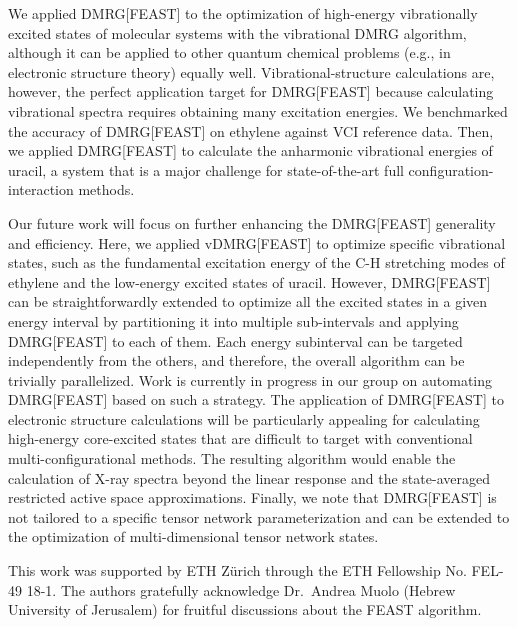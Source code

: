 \documentclass[journal=jctcce]{achemso}
\begin{document}
\noindent We applied DMRG[FEAST] to the optimization of high-energy vibrationally excited states of molecular systems with the vibrational DMRG algorithm, although it can be applied to other quantum chemical problems (e.g., in electronic structure
theory) equally well.
Vibrational-structure calculations are, however, the perfect application target for DMRG[FEAST] because calculating vibrational spectra requires obtaining many excitation energies.
We benchmarked the accuracy of DMRG[FEAST] on ethylene against VCI reference data.\cite{Delahaye2014_EthylenePES}
Then, we applied DMRG[FEAST] to calculate the anharmonic vibrational energies of uracil, a system that is a major challenge for state-of-the-art full configuration-interaction methods.\cite{Carrington2018_Uracil}

\noindent Our future work will focus on further enhancing the DMRG[FEAST] generality and efficiency.
Here, we applied vDMRG[FEAST] to optimize specific vibrational states, such as the fundamental excitation energy of the C-H stretching modes of ethylene and the low-energy excited states of uracil.
However, DMRG[FEAST] can be straightforwardly extended to optimize all the excited states in a given energy interval by partitioning it into multiple sub-intervals and applying DMRG[FEAST] to each of them.
Each energy subinterval can be targeted independently from the others, and therefore, the overall algorithm can be trivially parallelized.
Work is currently in progress in our group on automating DMRG[FEAST] based on such a strategy.
The application of DMRG[FEAST] to electronic structure calculations will be particularly appealing for calculating high-energy core-excited states that are difficult to target with conventional multi-configurational methods.
The resulting algorithm would enable the calculation of X-ray spectra beyond the linear response\cite{Nakatani2013_LinearResponse-DMRG} and the state-averaged restricted active space\cite{Lundberg2016_RAS-SCF_Core} approximations.
Finally, we note that DMRG[FEAST] is not tailored to a specific tensor network parameterization and can be extended to the optimization of multi-dimensional tensor network states.\cite{Larsson2019_TTNS-Vibrational}

\begin{acknowledgement}
This work was supported by ETH Z\"{u}rich through the ETH Fellowship No. FEL-49 18-1.
The authors gratefully acknowledge Dr.~Andrea Muolo (Hebrew University of Jerusalem) for fruitful discussions about the FEAST algorithm.
\end{acknowledgement}
\end{document}
